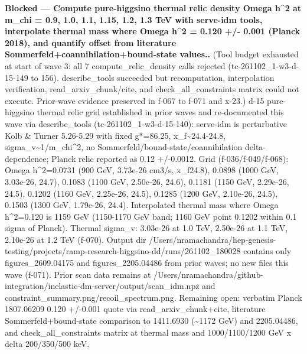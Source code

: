 \documentclass[11pt,a4paper]{article}
\begin{document}
\textbf{Blocked --- Compute pure-higgsino thermal relic density Omega h\textasciicircum{}2 at m\_chi = 0.9, 1.0, 1.1, 1.15, 1.2, 1.3 TeV with serve-idm tools, interpolate thermal mass where Omega h\textasciicircum{}2 = 0.120 +/- 0.001 (Planck 2018), and quantify offset from literature Sommerfeld+coannihilation+bound-state values..} (Tool budget exhausted at start of wave 3: all 7 compute\_relic\_density calls rejected (tc-261102\_1-w3-d-15-149 to 156). describe\_tools succeeded but recomputation, interpolation verification, read\_arxiv\_chunk/cite, and check\_all\_constraints matrix could not execute. Prior-wave evidence preserved in f-067 to f-071 and x-23.) d-15 pure-higgsino thermal relic grid established in prior waves and re-documented this wave via describe\_tools (tc-261102\_1-w3-d-15-140): serve-idm is perturbative Kolb \& Turner 5.26-5.29 with fixed g*=86.25, x\_f\textasciitilde{}24.4-24.8, sigma\_v\textasciitilde{}1/m\_chi\textasciicircum{}2, no Sommerfeld/bound-state/coannihilation delta-dependence; Planck relic reported as 0.12 +/-0.0012. Grid (f-036/f-049/f-068): Omega h\textasciicircum{}2=0.0731 (900 GeV, 3.73e-26 cm3/s, x\_f24.8), 0.0898 (1000 GeV, 3.03e-26, 24.7), 0.1083 (1100 GeV, 2.50e-26, 24.6), 0.1181 (1150 GeV, 2.29e-26, 24.5), 0.1202 (1160 GeV, 2.25e-26, 24.5), 0.1285 (1200 GeV, 2.10e-26, 24.5), 0.1503 (1300 GeV, 1.79e-26, 24.4). Interpolated thermal mass where Omega h\textasciicircum{}2=0.120 is 1159 GeV (1150-1170 GeV band; 1160 GeV point 0.1202 within 0.1 sigma of Planck). Thermal sigma\_v: 3.03e-26 at 1.0 TeV, 2.50e-26 at 1.1 TeV, 2.10e-26 at 1.2 TeV (f-070). Output dir /Users/nramachandra/hep-genesis-testing/projects/ramp-research-higgsino-dd/runs/261102\_180028 contains only figures\_2609.04175 and figures\_2205.04486 from prior waves; no new files this wave (f-071). Prior scan data remains at /Users/nramachandra/github-integration/inelastic-dm-server/output/scan\_idm.npz and constraint\_summary.png/recoil\_spectrum.png. Remaining open: verbatim Planck 1807.06209 0.120 +/-0.001 quote via read\_arxiv\_chunk+cite, literature Sommerfeld+bound-state comparison to 1411.6930 (\textasciitilde{}1172 GeV) and 2205.04486, and check\_all\_constraints matrix at thermal mass and 1000/1100/1200 GeV x delta 200/350/500 keV.
\end{document}
